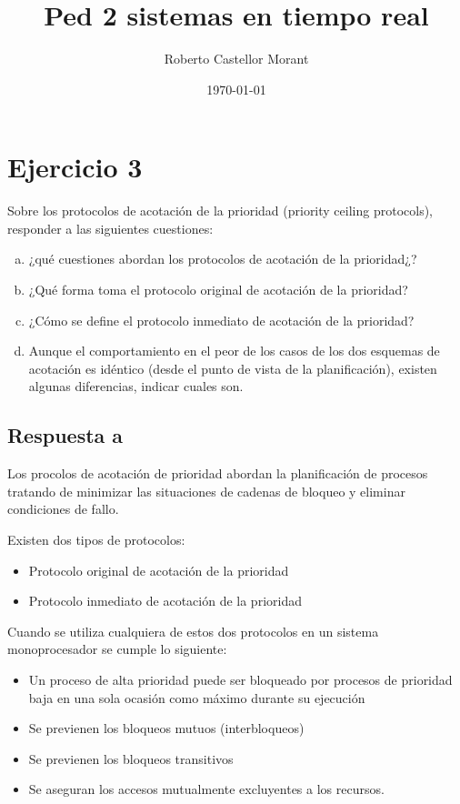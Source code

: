 \documentclass[a4paper,10pt]{article}
\author{Roberto Castellor Morant}
\title{Ped 2 sistemas en tiempo real}
\date{\today}
\begin{document}
\maketitle


\section{Ejercicio 3}

Sobre los protocolos de acotación de la prioridad (priority ceiling protocols),
responder a las siguientes cuestiones:
\begin{enumerate}[a)]
	\item ¿qué cuestiones abordan los protocolos de acotación de la
		prioridad¿?
	\item ¿Qué forma toma el protocolo original de acotación de la prioridad?
	\item ¿Cómo se define el protocolo inmediato de acotación de la prioridad?
	\item Aunque el comportamiento en el peor de los casos de los dos 
		esquemas de acotación es idéntico (desde el punto de vista de la 
		planificación), existen algunas diferencias, indicar cuales son.

\end{enumerate}

\subsection{Respuesta a}

Los procolos de acotación de prioridad abordan la planificación de procesos
tratando de minimizar las situaciones de cadenas de bloqueo y eliminar
condiciones de fallo.

Existen dos tipos de protocolos:

\begin{itemize}
	\item Protocolo original de acotación de la prioridad
	\item Protocolo inmediato de acotación de la prioridad
\end{itemize}

Cuando se utiliza cualquiera de estos dos protocolos en un sistema
monoprocesador se cumple lo siguiente:

\begin{itemize}
	\item Un proceso de alta prioridad puede ser bloqueado por procesos de
		prioridad baja en una sola ocasión como máximo durante su
		ejecución
	\item Se previenen los bloqueos mutuos (interbloqueos)
	\item Se previenen los bloqueos transitivos
	\item Se aseguran los accesos mutualmente excluyentes a los recursos.
\end{itemize}
\end{document}
